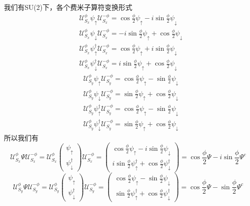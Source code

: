 \documentclass[a4paper]{article}
\numberwithin{equation}{subsection}
\newcommand{\mU}{\mathcal{U}}
\begin{document}
我们有SU(2)下，各个费米子算符变换形式
\begin{equation}
    \begin{split}
        &\mU_{S_x}^\phi\psi_\uparrow\mU_{S_x}^{-\phi}=\cos\frac{\phi}{2}\psi_\uparrow-i\sin\frac{\phi}{2}\psi_\downarrow\\
        &\mU_{S_x}^\phi\psi_\downarrow\mU_{S_x}^{-\phi}=-i\sin\frac{\phi}{2}\psi_\uparrow+\cos\frac{\phi}{2}\psi_\downarrow\\
        &\mU_{S_x}^\phi\psi_\uparrow^\dagger\mU_{S_x}^{-\phi}=\cos\frac{\phi}{2}\psi_\uparrow+i\sin\frac{\phi}{2}\psi_\downarrow\\
        &\mU_{S_x}^\phi\psi_\downarrow^\dagger\mU_{S_x}^{-\phi}=i\sin\frac{\phi}{2}\psi_\uparrow+\cos\frac{\phi}{2}\psi_\downarrow
    \end{split}
\end{equation}
\begin{equation}
    \begin{split}
        &\mU_{S_y}^\phi\psi_\uparrow\mU_{S_y}^{-\phi}=\cos\frac{\phi}{2}\psi_\uparrow-\sin\frac{\phi}{2}\psi_\downarrow\\
        &\mU_{S_y}^\phi\psi_\downarrow\mU_{S_y}^{-\phi}=\sin\frac{\phi}{2}\psi_\uparrow+\cos\frac{\phi}{2}\psi_\downarrow\\
        &\mU_{S_y}^\phi\psi_\uparrow^\dagger\mU_{S_y}^{-\phi}=\cos\frac{\phi}{2}\psi_\uparrow-\sin\frac{\phi}{2}\psi_\downarrow\\
        &\mU_{S_y}^\phi\psi_\downarrow^\dagger\mU_{S_y}^{-\phi}=\sin\frac{\phi}{2}\psi_\uparrow+\cos\frac{\phi}{2}\psi_\downarrow
    \end{split}
\end{equation}
所以我们有
\begin{equation}
    \mU_{S_x}^\phi\Psi\mU_{S_x}^{-\phi}=\mU_{S_x}^\phi\begin{pmatrix}
        \psi_\uparrow\\
        \psi_\downarrow^\dagger
    \end{pmatrix}\mU_{S_x}^{-\phi}=\begin{pmatrix}
        \cos\frac{\phi}{2}\psi_\uparrow-i\sin\frac{\phi}{2}\psi_\downarrow\\
        i\sin\frac{\phi}{2}\psi_\uparrow^\dagger+\cos\frac{\phi}{2}\psi_\downarrow^\dagger
    \end{pmatrix}=\cos\frac{\phi}{2}\Psi-i\sin\frac{\phi}{2}\Psi^c
\end{equation}
\begin{equation}
    \mU_{S_y}^\phi\Psi\mU_{S_y}^{-\phi}=\mU_{S_y}^\phi\begin{pmatrix}
        \psi_\uparrow\\
        \psi_\downarrow^\dagger
    \end{pmatrix}\mU_{S_y}^{-\phi}=\begin{pmatrix}
        \cos\frac{\phi}{2}\psi_\uparrow-\sin\frac{\phi}{2}\psi_\downarrow\\
        \sin\frac{\phi}{2}\psi_\uparrow^\dagger+\cos\frac{\phi}{2}\psi_\downarrow^\dagger
    \end{pmatrix}=\cos\frac{\phi}{2}\Psi-\sin\frac{\phi}{2}\Psi^c
\end{equation}
\end{document}
